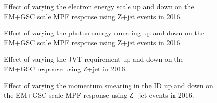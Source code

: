\begin{figure}[!ht]
  \begin{center}
  \end{center}
  \caption[Effect of Egamma scale uncertainty on EM scale response with Z+jet]
  {Effect of varying the electron energy scale up and down on the EM+GSC scale MPF response using Z+jet events in 2016.}
  \label{plot:ZJetEM2016EGScaleApp}
\end{figure}

\begin{figure}[!ht]
  \begin{center}
  \end{center}
  \caption[Egamma resolution uncertainty on EM scale response with Z+jet]
{Effect of varying the photon energy smearing up and down on the EM+GSC scale MPF response using Z+jet events in 2016.}
  \label{plot:ZJetEM2016EGResolutionApp}
\end{figure}


\begin{figure}[!ht]
  \begin{center}
  \end{center}
  \caption[JVT uncertainty, EM+GSC scale with 2016 Z+jet]
  {Effect of varying the JVT requirement up and down on the EM+GSC response using Z+jet in 2016.}
  \label{plot:ZJetEM2016JVTApp}
\end{figure}

\begin{figure}[!ht]
  \begin{center}
  \end{center}
  \caption[Muon ID uncertainty, EM+GSC scale with 2016 Z+jet]
  {Effect of varying the momentum smearing in the ID up and down on the EM+GSC scale MPF response using Z+jet events in 2016. }
  \label{plot:ZJetEM2016nIDpp}
\end{figure}

